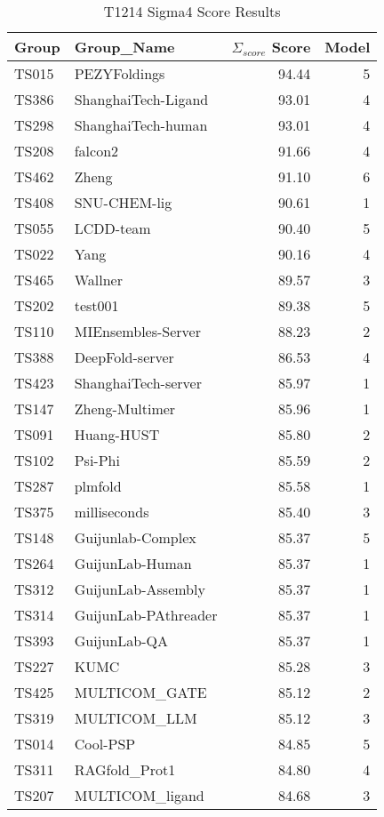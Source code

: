 \begin{table*}[ht]
\caption{T1214 Sigma4 Score Results}
\label{tab:T1214_Sigma_score_split}
\scriptsize
\begin{minipage}[t]{0.48\textwidth}
\centering
\begin{tabular}{llrr}
\toprule
Group & Group\_Name & $\Sigma_{score}$ Score & Model \\ 
\midrule
TS015 & PEZYFoldings & 94.44 & 5 \\ 
TS386 & ShanghaiTech-Ligand & 93.01 & 4 \\ 
TS298 & ShanghaiTech-human & 93.01 & 4 \\ 
TS208 & falcon2 & 91.66 & 4 \\ 
TS462 & Zheng & 91.10 & 6 \\ 
TS408 & SNU-CHEM-lig & 90.61 & 1 \\ 
TS055 & LCDD-team & 90.40 & 5 \\ 
TS022 & Yang & 90.16 & 4 \\ 
TS465 & Wallner & 89.57 & 3 \\ 
TS202 & test001 & 89.38 & 5 \\ 
TS110 & MIEnsembles-Server & 88.23 & 2 \\ 
TS388 & DeepFold-server & 86.53 & 4 \\ 
TS423 & ShanghaiTech-server & 85.97 & 1 \\ 
TS147 & Zheng-Multimer & 85.96 & 1 \\ 
TS091 & Huang-HUST & 85.80 & 2 \\ 
TS102 & Psi-Phi & 85.59 & 2 \\ 
TS287 & plmfold & 85.58 & 1 \\ 
TS375 & milliseconds & 85.40 & 3 \\ 
TS148 & Guijunlab-Complex & 85.37 & 5 \\ 
TS264 & GuijunLab-Human & 85.37 & 1 \\ 
TS312 & GuijunLab-Assembly & 85.37 & 1 \\ 
TS314 & GuijunLab-PAthreader & 85.37 & 1 \\ 
TS393 & GuijunLab-QA & 85.37 & 1 \\ 
TS227 & KUMC & 85.28 & 3 \\ 
TS425 & MULTICOM\_GATE & 85.12 & 2 \\ 
TS319 & MULTICOM\_LLM & 85.12 & 3 \\ 
TS014 & Cool-PSP & 84.85 & 5 \\ 
TS311 & RAGfold\_Prot1 & 84.80 & 4 \\ 
TS207 & MULTICOM\_ligand & 84.68 & 3 \\ 

\end{tabular}
\end{minipage}
\end{table*}
